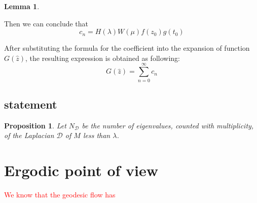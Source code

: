 \documentclass[12pt,a4paper,english]{article}
\theoremstyle{plain}
\newtheorem{lem}[thm]{Lemma}
\newtheorem{prop}[thm]{Proposition}
\theoremstyle{definition}
\theoremstyle{remark}
\begin{document}
\begin{lem}
    
\end{lem}
Then we can conclude that 
\begin{equation*}
    c_{n}=H(\lambda)W(\mu)f(z_{0})g(t_{0})
\end{equation*}

After substituting the formula for the coefficient into the expansion of function $G(\hat{z})$, the resulting expression is obtained as following:
\begin{equation*}
G(\hat{z})=\sum_{n=0}^{\infty}c_{n}
\end{equation*}
\subsection{statement}
\begin{prop}
Let $N_{\mathcal{D}}$ be the number of eigenvalues, counted with multiplicity, of the Laplacian $\mathcal{D}$ of $M$ less than $\lambda$.   
\end{prop}

\section{Ergodic point of view}

\textcolor{red}{We know that the geodesic flow has }


\newpage


\end{document}
